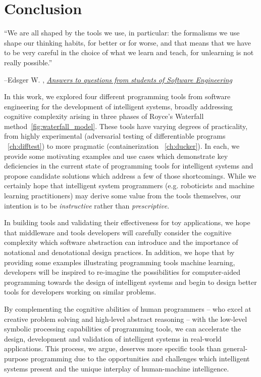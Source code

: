 \chapter{Conclusion}\label{ch:conclusion}
\setlength{\epigraphwidth}{0.90\textwidth}
\epigraph{``We are all shaped by the tools we use, in particular: the formalisms we use shape our thinking habits, for better or for worse, and that means that we have to be very careful in the choice of what we learn and teach, for unlearning is not really possible.''}{\begin{flushright}--Edsger W. \citet{dijkstra2000answers}, \href{https://www.cs.utexas.edu/~EWD/transcriptions/EWD13xx/EWD1305.html}{\textit{Answers to questions from students of Software Engineering}}\end{flushright}}

In this work, we explored four different programming tools from software engineering for the development of intelligent systems, broadly addressing cognitive complexity arising in three phases of Royce's Waterfall method~\autoref{fig:waterfall_model}. These tools have varying degrees of practicality, from highly experimental (adversarial testing of differentiable programs ~\autoref{ch:difftest}) to more pragmatic (containerization ~\autoref{ch:ducker}). In each, we provide some motivating examples and use cases which demonstrate key deficiencies in the current state of programming tools for intelligent systems and propose candidate solutions which address a few of those shortcomings. While we certainly hope that intelligent system programmers (e.g. roboticists and machine learning practitioners) may derive some value from the tools themselves, our intention is to be \textit{instructive} rather than \textit{prescriptive}.

In building tools and validating their effectiveness for toy applications, we hope that middleware and tools developers will carefully consider the cognitive complexity which software abstraction can introduce and the importance of notational and denotational design practices. In addition, we hope that by providing some examples illustrating programming tools machine learning, developers will be inspired to re-imagine the possibilities for computer-aided programming towards the design of intelligent systems and begin to design better tools for developers working on similar problems.

By complementing the cognitive abilities of human programmers -- who excel at creative problem solving and high-level abstract reasoning -- with the low-level symbolic processing capabilities of programming tools, we can accelerate the design, development and validation of intelligent systems in real-world applications. This process, we argue, deserves more specific tools than general-purpose programming due to the opportunities and challenges which intelligent systems present and the unique interplay of human-machine intelligence.

